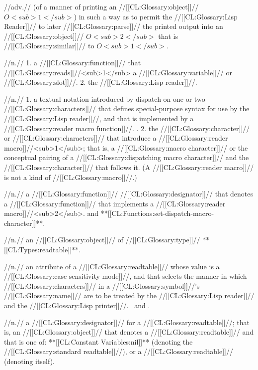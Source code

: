  //adv.// (of a manner of printing an //[[CL:Glossary:object]]// $O<sub>1</sub>$) in such a way as to permit the //[[CL:Glossary:Lisp Reader]]// to later //[[CL:Glossary:parse]]// the printed output into an //[[CL:Glossary:object]]// $O<sub>2</sub>$ that is //[[CL:Glossary:similar]]// to $O<sub>1</sub>$.

 //n.// 1. a //[[CL:Glossary:function]]// that //[[CL:Glossary:reads]]//<sub>1</sub> a //[[CL:Glossary:variable]]// or //[[CL:Glossary:slot]]//. 2. the //[[CL:Glossary:Lisp reader]]//.

 //n.// 1. a textual notation introduced by dispatch on one or two //[[CL:Glossary:characters]]// that defines special-purpose syntax for use by the //[[CL:Glossary:Lisp reader]]//, and that is implemented by a //[[CL:Glossary:reader macro function]]//. \Seesection\ReaderAlgorithm. 2. the //[[CL:Glossary:character]]// or //[[CL:Glossary:characters]]// that introduce a //[[CL:Glossary:reader macro]]//<sub>1</sub>; that is, a //[[CL:Glossary:macro character]]// or the conceptual pairing of a //[[CL:Glossary:dispatching macro character]]// and the //[[CL:Glossary:character]]// that follows it. (A //[[CL:Glossary:reader macro]]// is not a kind of //[[CL:Glossary:macro]]//.)

 //n.// a //[[CL:Glossary:function]]// //[[CL:Glossary:designator]]// that denotes a //[[CL:Glossary:function]]// that implements a //[[CL:Glossary:reader macro]]//<sub>2</sub>.  and **[[CL:Functions:set-dispatch-macro-character]]**.

 //n.// an //[[CL:Glossary:object]]// of //[[CL:Glossary:type]]// **[[CL:Types:readtable]]**.

 //n.// an attribute of a //[[CL:Glossary:readtable]]// whose value is a //[[CL:Glossary:case sensitivity mode]]//, and that selects the manner in which //[[CL:Glossary:characters]]// in a //[[CL:Glossary:symbol]]//'s //[[CL:Glossary:name]]// are to be treated by the //[[CL:Glossary:Lisp reader]]// and the //[[CL:Glossary:Lisp printer]]//. \Seesection\ReadtableCaseReadEffect\ and \secref\ReadtableCasePrintEffect.

 //n.// a //[[CL:Glossary:designator]]// for a //[[CL:Glossary:readtable]]//; that is, an //[[CL:Glossary:object]]// that denotes a //[[CL:Glossary:readtable]]// and that is one of: **[[CL:Constant Variables:nil]]** (denoting the //[[CL:Glossary:standard readtable]]//), or a //[[CL:Glossary:readtable]]// (denoting itself).

